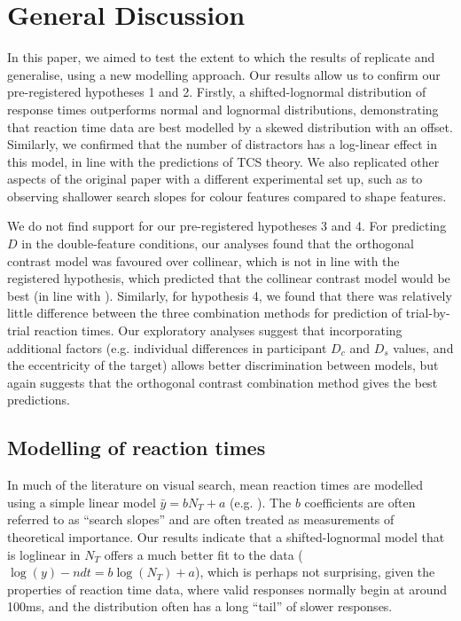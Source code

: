 \documentclass[preprint,12pt,authoryear]{elsarticle}
\begin{document}
\section{General Discussion}

In this paper, we aimed to test the extent to which the results of \cite{buetti2019predicting} replicate and generalise, using a new modelling approach. Our results allow us to confirm our pre-registered hypotheses 1 and 2. Firstly, a shifted-lognormal distribution of response times outperforms normal and lognormal distributions, demonstrating that reaction time data are best modelled by a skewed distribution with an offset. Similarly, we confirmed that the number of distractors has a log-linear effect in this model, in line with the predictions of TCS theory. We also replicated other aspects of the original \cite{buetti2019predicting} paper with a different experimental set up, such as to observing shallower search slopes for colour features compared to shape features.

We do not find support for our pre-registered hypotheses 3 and 4. For predicting $D$ in the double-feature conditions, our analyses found that the orthogonal contrast model was favoured over collinear, which is not in line with the registered hypothesis, which predicted that the collinear contrast model would be best (in line with \cite{buetti2019predicting}). Similarly, for hypothesis 4, we found that there was relatively little difference between the three combination methods for prediction of trial-by-trial reaction times. Our exploratory analyses suggest that incorporating additional factors (e.g. individual differences in participant $D_c$ and $D_s$ values, and the eccentricity of the target) allows better discrimination between models, but again suggests that the orthogonal contrast combination method gives the best predictions.

\subsection{Modelling of reaction times}

In much of the literature on visual search, mean reaction times are modelled using a simple linear model $\bar{y} = b N_T + a$ (e.g. \cite{treisman1988feature,rosenholtz2012summary, hughes2016quantifying}). The $b$ coefficients are often referred to as ``search slopes'' and are often treated as measurements of theoretical importance. Our results indicate that a shifted-lognormal model that is loglinear in $N_T$ offers a much better fit to the data ($\log(y) - ndt = b\log(N_T) + a$), which is perhaps not surprising, given the properties of reaction time data, where valid responses normally begin at around 100ms, and the distribution often has a long ``tail'' of slower responses.
\end{document}
